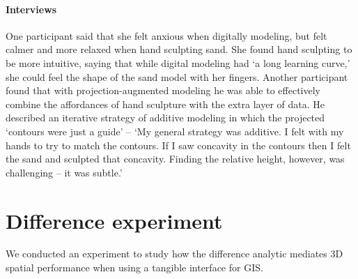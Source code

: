\documentclass[prodmode,acmtochi]{acmsmall} %
\begin{document}
\paragraph{Interviews}

% 
%



One participant said that she felt anxious when digitally modeling,
but felt calmer and more relaxed when hand sculpting sand. 
%
She found hand sculpting to be more intuitive, saying that
while digital modeling had `a long learning curve,' 
she could feel the shape of the sand model with her fingers.
%
Another participant found that 
with projection-augmented modeling 
he was able to effectively combine 
the affordances of hand sculpture 
with the extra layer of data. 
%
He described an iterative strategy of additive modeling
in which the projected `contours were just a guide' --  
`My general strategy was additive. 
I felt with my hands to try to match the contours. 
If I saw concavity in the contours 
then I felt the sand and sculpted that concavity.
Finding the relative height, however, was challenging -- it was subtle.'

\section{Difference experiment}
We conducted an experiment to study 
how the difference analytic mediates 3D spatial performance 
when using a tangible interface for GIS.
\end{document}
